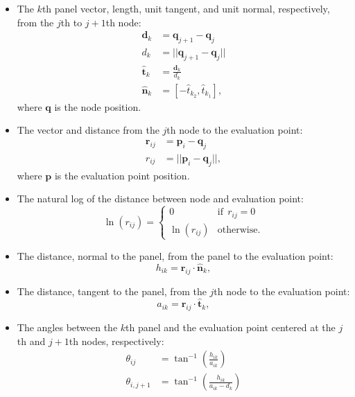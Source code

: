 \documentclass[]{article}
\newcommand{\vect}{\mathbf}
\begin{document}
\begin{itemize}
	\item The \(k\)th panel vector, length, unit tangent, and unit normal, respectively, from the \(j\)th to \(j+1\)th node:
	\begin{align}
		\vect{d}_k &= \vect{q}_{j+1} - \vect{q}_j \\
		d_k &= || \vect{q}_{j+1} - \vect{q}_j || \\
		\vect{\hat{t}}_k &= \frac{\vect{d}_k}{d_k} \\
		\vect{\hat{n}}_k &= [-\hat{t}_{k_2}, \hat{t}_{k_1}],
	\end{align}
	\noindent where \(\vect{q}\) is the node position.
	\item The vector and distance from the \(j\)th node to the evaluation point:
	\begin{align}
		\vect{r}_{ij} &= \vect{p}_i - \vect{q}_j \\
		r_{ij} &= ||\vect{p}_i - \vect{q}_j||,
	\end{align}
	\noindent where \(\vect{p}\) is the evaluation point position.
	\item The natural log of the distance between node and evaluation point:
	\begin{equation}
		\ln(r_{ij}) = \begin{cases}
			0 & \mathrm{if}~~ r_{ij} = 0 \\
			\ln(r_{ij}) & \mathrm{otherwise.}
		\end{cases}
	\end{equation}
	\item The distance, normal to the panel, from the panel to the evaluation point:
	\begin{equation}
		h_{ik} = \vect{r}_{ij}\cdot \vect{\hat{n}}_{k},
	\end{equation}
	\item The distance, tangent to the panel, from the \(j\)th node to the evaluation point:
	\begin{equation}
		a_{ik} = \vect{r}_{ij}\cdot \vect{\hat{t}}_{k},
	\end{equation}
	\item The angles between the \(k\)th panel and the evaluation point centered at the \(j\)th and \(j+1\)th nodes, respectively:
	\begin{align}
		\theta_{ij} &= \tan^{-1} \left( \frac{h_{ik}}{a_{ik}} \right) \\
		\theta_{i,j+1} &= \tan^{-1} \left( \frac{h_{ik}}{a_{ik} - d_k} \right) 
	\end{align}
\end{itemize}
\end{document}
